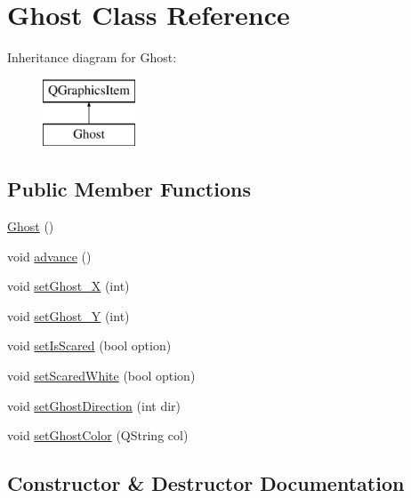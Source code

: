 \hypertarget{class_ghost}{}\section{Ghost Class Reference}
\label{class_ghost}
Inheritance diagram for Ghost\+:\begin{figure}[H]
\begin{center}
\leavevmode
\includegraphics[height=2.000000cm]{class_ghost}
\end{center}
\end{figure}
\subsection*{Public Member Functions}
\begin{DoxyCompactItemize}
\item 
\mbox{\hyperlink{class_ghost_a2e38d3c0c8546cceb74777b49a8e3bb7}{Ghost}} ()
\item 
void \mbox{\hyperlink{class_ghost_a0f15e38a34a0b2a4d6e05aa1f686210e}{advance}} ()
\item 
void \mbox{\hyperlink{class_ghost_abf91d6d8445cdf10291047fba33702c4}{set\+Ghost\+\_\+X}} (int)
\item 
void \mbox{\hyperlink{class_ghost_a670e6a5ae3a156b7833452375aedf0e3}{set\+Ghost\+\_\+Y}} (int)
\item 
void \mbox{\hyperlink{class_ghost_a6e6f3e5ff87c2c9efeb58c188530f431}{set\+Is\+Scared}} (bool option)
\item 
void \mbox{\hyperlink{class_ghost_a22197187d8c42a2a2d2f0facdda54356}{set\+Scared\+White}} (bool option)
\item 
void \mbox{\hyperlink{class_ghost_a021a76713a5fdf501fd601d8644002bb}{set\+Ghost\+Direction}} (int dir)
\item 
void \mbox{\hyperlink{class_ghost_a16d120b99cd6a6c7f47ec067a09ef74b}{set\+Ghost\+Color}} (Q\+String col)
\end{DoxyCompactItemize}


\subsection{Constructor \& Destructor Documentation}
\mbox{\label{class_ghost_a2e38d3c0c8546cceb74777b49a8e3bb7}} 
